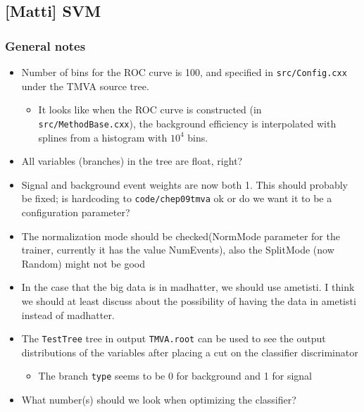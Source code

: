 \subsection{[Matti] SVM}

\subsubsection{General notes}
\begin{itemize}
\item Number of bins for the ROC curve is 100, and specified in
  \texttt{src/Config.cxx} under the TMVA source tree.
  \begin{itemize}
  \item It looks like when the ROC curve is constructed (in
    \texttt{src/MethodBase.cxx}), the background efficiency is
    interpolated with splines from a histogram with $10^4$ bins.
  \end{itemize}
\item All variables (branches) in the tree are float, right?
\item Signal and background event weights are now both 1. This should
  probably be fixed; is hardcoding to \texttt{code/chep09tmva} ok or
  do we want it to be a configuration parameter?
\item The normalization mode should be checked(NormMode parameter for
  the trainer, currently it has the value NumEvents), also the
  SplitMode (now Random) might not be good
\item In the case that the big data is in madhatter, we should use
  ametisti. I think we should at least discuss about the possibility
  of having the data in ametisti instead of madhatter.
\item The \texttt{TestTree} tree in output \texttt{TMVA.root} can be
  used to see the output distributions of the variables after placing
  a cut on the classifier discriminator
  \begin{itemize}
  \item The branch \texttt{type} seems to be 0 for background and 1 for signal
  \end{itemize}
\item What number(s) should we look when optimizing the classifier?
\end{itemize}

